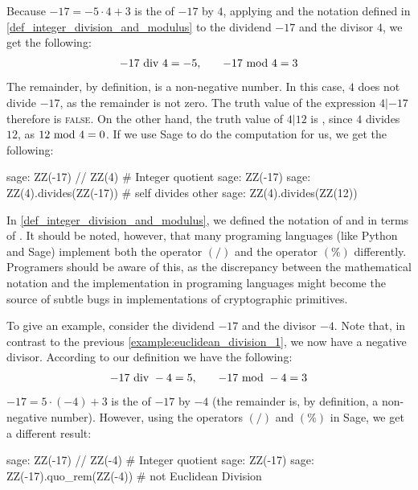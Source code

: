 \begin{example}
\label{example:euclidean_division_1}
 Because $ -17 = -5 \cdot 4 + 3 $  is the  of $-17$ by $4$, applying  and the notation defined in \ref{def_integer_division_and_modulus} to the dividend $-17$ and the divisor $4$, we get the following:
\begin{equation}
\begin{array}{lcr}
-17 \text{ div } 4 = - 5, & & -17 \text{ mod } 4 = 3
\end{array}
\end{equation}
The remainder, by definition, is a non-negative number. In this case, $4$ does not divide $-17$, as the remainder is not zero. The truth value of the expression $4 | -17 $ therefore is \textsc{false}. On the other hand, the truth value of $4 | 12$ is , since $4$ divides $12$, as $ 12 \text{ mod } 4 = 0 $. If we use  Sage to do the computation for us, we get the following:
\begin{sagecommandline}
sage: ZZ(-17) // ZZ(4) # Integer quotient
sage: ZZ(-17) %
sage: ZZ(4).divides(ZZ(-17)) # self divides other
sage: ZZ(4).divides(ZZ(12))
\end{sagecommandline}
\end{example}
\begin{remark} In \ref{def_integer_division_and_modulus}, we defined the notation of   and  in terms of . It should be noted, however, that many programing languages (like Python and  Sage) implement both the operator $(/)$ and the operator $(\%)$ differently. Programers should be aware of this, as the discrepancy between the mathematical notation and the implementation in programing languages might become the source of subtle bugs in implementations of cryptographic primitives.

To give an example, consider the dividend $-17$ and the divisor $-4$. Note that, in contrast to the previous \examplename{} \ref{example:euclidean_division_1}, we now have a negative divisor. According to our definition we have the following:
\begin{equation}\label{euclidean-negative}
\begin{array}{lcr}
-17 \text{ div } -4 = 5, & & -17 \text{ mod } -4 = 3
\end{array}
\end{equation}
$ -17 = 5 \cdot (-4) + 3 $  is the  of $-17$ by $-4$ (the remainder is, by definition, a non-negative number). However, using the operators $(/)$ and $(\%)$ in  Sage, we get a different result: 

\begin{sagecommandline}
sage: ZZ(-17) // ZZ(-4) # Integer quotient
sage: ZZ(-17) %
sage: ZZ(-17).quo_rem(ZZ(-4)) # not Euclidean Division
\end{sagecommandline}
\end{remark}

